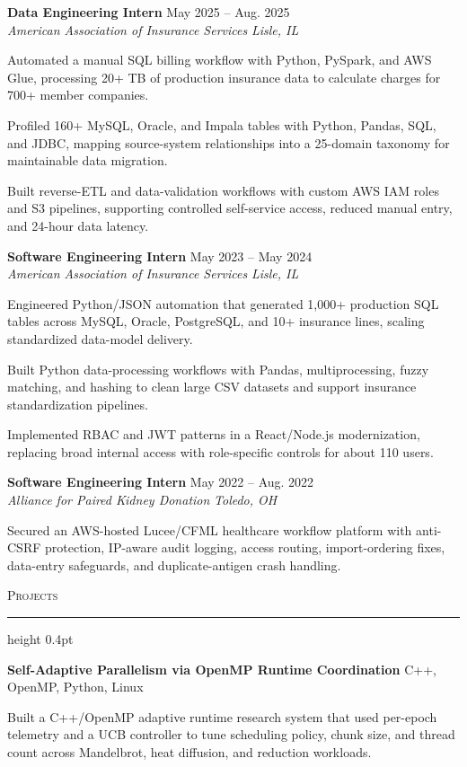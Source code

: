 \documentclass[letterpaper,11pt]{article}
\newcommand{\resumesection}[1]{%
  \par\vspace{2pt}%
  {\large\scshape #1}\par\vspace{2pt}%
  \hrule height 0.4pt\vspace{2pt}%
}
\newcommand{\resumeSubheading}[4]{
  \textbf{#1} \hfill #2\\
  \textit{#3} \hfill \textit{#4}
}
\newcommand{\projectHeading}[2]{
  \textbf{#1} \hfill #2
}
\begin{document}
\resumeSubheading
{Data Engineering Intern}{May 2025 -- Aug. 2025}
{American Association of Insurance Services}{Lisle, IL}
\begin{tightitemize}
  \item Automated a manual SQL billing workflow with Python, PySpark, and AWS Glue, processing 20+ TB of production insurance data to calculate charges for 700+ member companies.
  \item Profiled 160+ MySQL, Oracle, and Impala tables with Python, Pandas, SQL, and JDBC, mapping source-system relationships into a 25-domain taxonomy for maintainable data migration.
  \item Built reverse-ETL and data-validation workflows with custom AWS IAM roles and S3 pipelines, supporting controlled self-service access, reduced manual entry, and 24-hour data latency.
\end{tightitemize}

\resumeSubheading
{Software Engineering Intern}{May 2023 -- May 2024}
{American Association of Insurance Services}{Lisle, IL}
\begin{tightitemize}
  \item Engineered Python/JSON automation that generated 1,000+ production SQL tables across MySQL, Oracle, PostgreSQL, and 10+ insurance lines, scaling standardized data-model delivery.
  \item Built Python data-processing workflows with Pandas, multiprocessing, fuzzy matching, and hashing to clean large CSV datasets and support insurance standardization pipelines.
  \item Implemented RBAC and JWT patterns in a React/Node.js modernization, replacing broad internal access with role-specific controls for about 110 users.
\end{tightitemize}

\resumeSubheading
{Software Engineering Intern}{May 2022 -- Aug. 2022}
{Alliance for Paired Kidney Donation}{Toledo, OH}
\begin{tightitemize}
  \item Secured an AWS-hosted Lucee/CFML healthcare workflow platform with anti-CSRF protection, IP-aware audit logging, access routing, import-ordering fixes, data-entry safeguards, and duplicate-antigen crash handling.
\end{tightitemize}

\resumesection{Projects}
\projectHeading{Self-Adaptive Parallelism via OpenMP Runtime Coordination}{C++, OpenMP, Python, Linux}
\begin{tightitemize}
  \item Built a C++/OpenMP adaptive runtime research system that used per-epoch telemetry and a UCB controller to tune scheduling policy, chunk size, and thread count across Mandelbrot, heat diffusion, and reduction workloads.
\end{tightitemize}
\end{document}
